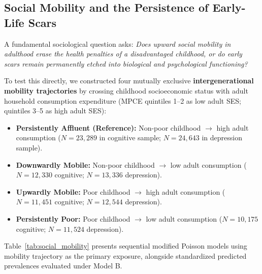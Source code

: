 \subsection{Social Mobility and the Persistence of Early-Life Scars}
A fundamental sociological question asks: \textit{Does upward social mobility in adulthood erase the health penalties of a disadvantaged childhood, or do early scars remain permanently etched into biological and psychological functioning?}

To test this directly, we constructed four mutually exclusive \textbf{intergenerational mobility trajectories} by crossing childhood socioeconomic status with adult household consumption expenditure (MPCE quintiles 1--2 as low adult SES; quintiles 3--5 as high adult SES):
\begin{itemize}
    \item \textbf{Persistently Affluent (Reference):} Non-poor childhood $\rightarrow$ high adult consumption ($N = 23{,}289$ in cognitive sample; $N = 24{,}643$ in depression sample).
    \item \textbf{Downwardly Mobile:} Non-poor childhood $\rightarrow$ low adult consumption ($N = 12{,}330$ cognitive; $N = 13{,}336$ depression).
    \item \textbf{Upwardly Mobile:} Poor childhood $\rightarrow$ high adult consumption ($N = 11{,}451$ cognitive; $N = 12{,}544$ depression).
    \item \textbf{Persistently Poor:} Poor childhood $\rightarrow$ low adult consumption ($N = 10{,}175$ cognitive; $N = 11{,}524$ depression).
\end{itemize}

Table~\ref{tab:social_mobility} presents sequential modified Poisson models using mobility trajectory as the primary exposure, alongside standardized predicted prevalences evaluated under Model B.

